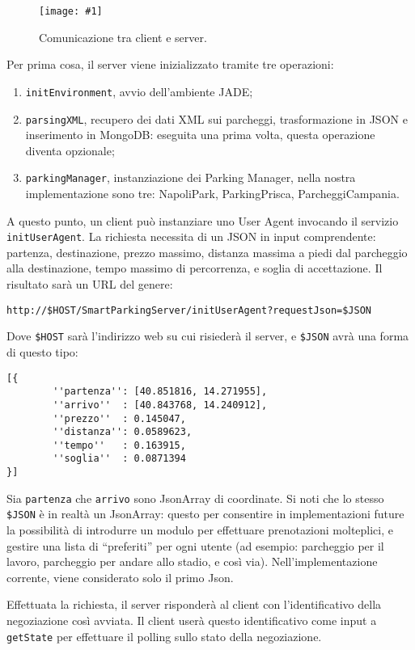 \documentclass[11pt,a4paper,twoside]{article}
\numberwithin{figure}{section}
\numberwithin{equation}{section}
\newcommand{\img}[6]{
    \begin{figure}[#5]
        \centerline{\texttt{[image: \#1]}}
        \caption{#2}
        \label{#3}
    \end{figure}
}
\begin{document}
\img{workflow}{Comunicazione tra client e server.}{fig:4}{.85}{ht}

\noindent Per prima cosa, il server viene inizializzato tramite tre operazioni:
\begin{enumerate}
    \item \texttt{initEnvironment}, avvio dell'ambiente JADE;
    \item \texttt{parsingXML}, recupero dei dati XML sui parcheggi, trasformazione in JSON e inserimento in MongoDB: eseguita una prima volta, questa operazione diventa opzionale;
    \item \texttt{parkingManager}, instanziazione dei Parking Manager, nella nostra implementazione sono tre: \textsf{NapoliPark}, \textsf{ParkingPrisca}, \textsf{ParcheggiCampania}.
\end{enumerate}
A questo punto, un client può instanziare uno User Agent invocando il servizio \texttt{initUserAgent}. La richiesta necessita di un JSON in input comprendente: partenza, destinazione, prezzo massimo, distanza massima a piedi dal parcheggio alla destinazione, tempo massimo di percorrenza, e soglia di accettazione. Il risultato sarà un URL del genere:

\begin{verbatim}
http://$HOST/SmartParkingServer/initUserAgent?requestJson=$JSON
\end{verbatim}
Dove \texttt{\$HOST} sarà l'indirizzo web su cui risiederà il server, e \texttt{\$JSON} avrà una forma di questo tipo:

\begin{verbatim}
[{
        ''partenza'': [40.851816, 14.271955],
        ''arrivo''  : [40.843768, 14.240912],
        ''prezzo''  : 0.145047,
        ''distanza'': 0.0589623,
        ''tempo''   : 0.163915,
        ''soglia''  : 0.0871394
}]
\end{verbatim}

Sia \texttt{partenza} che \texttt{arrivo} sono \textsf{JsonArray} di coordinate.
Si noti che lo stesso \texttt{\$JSON} è in realtà un \textsf{JsonArray}: questo per consentire in implementazioni future la possibilità di introdurre un modulo per effettuare prenotazioni molteplici, e gestire una lista di ``preferiti'' per ogni utente (ad esempio: parcheggio per il lavoro, parcheggio per andare allo stadio, e così via).
Nell'implementazione corrente, viene considerato solo il primo \textsf{Json}.

Effettuata la richiesta, il server risponderà al client con l'identificativo della negoziazione così avviata. Il client userà questo identificativo come input a \texttt{getState} per effettuare il polling sullo stato della negoziazione.
\end{document}
